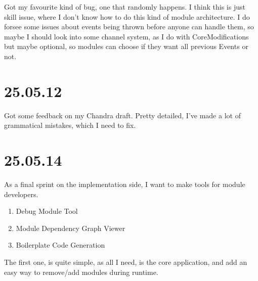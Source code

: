 Got my favourite kind of bug, one that randomly happens. I think this is just
skill issue, where I don't know how to do this kind of module architecture. I
do forsee some issues about events being thrown before anyone can handle them,
so maybe I should look into some channel system, as I do with CoreModifications
but maybe optional, so modules can choose if they want all previous Events or
not.


\section{25.05.12}

Got some feedback on my Chandra draft. Pretty detailed, I've made a lot of
grammatical mistakes, which I need to fix.


\section{25.05.14}

As a final sprint on the implementation side, I want to make tools for module
developers.

\begin{enumerate}
  \item Debug Module Tool
  \item Module Dependency Graph Viewer
  \item Boilerplate Code Generation
\end{enumerate}

The first one, is quite simple, as all I need, is the core application, and add
an easy way to remove/add modules during runtime.